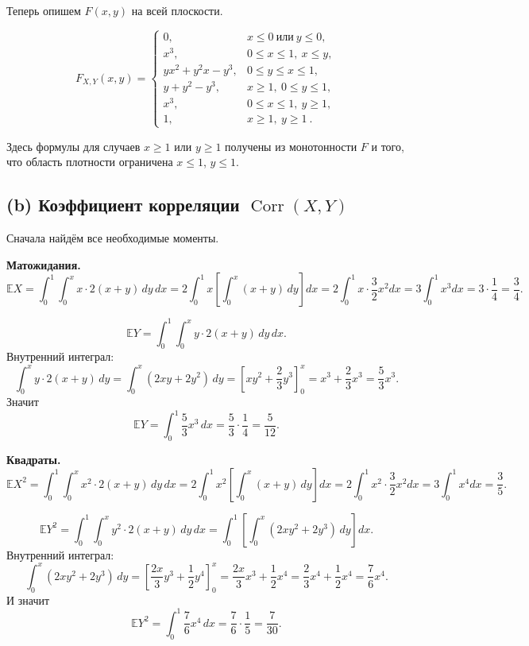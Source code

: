 \documentclass[12pt]{article}
\DeclareMathOperator{\Corr}{Corr}
\newcommand{\E}{\mathbb{E}}
\begin{document}
    Теперь опишем $F(x,y)$ на всей плоскости.

    \[
        F_{X,Y}(x,y)
        =
        \begin{cases}
            0, & x \le 0 \ \text{или}\ y \le 0,\\[6pt]
            x^3, & 0 \le x \le 1,\ x \le y,\\[6pt]
            yx^2 + y^2 x - y^3,
            & 0 \le y \le x \le 1,\\[6pt]
            y + y^2 - y^3, & x \ge 1,\ 0 \le y \le 1,\\[6pt]
            x^3, & 0 \le x \le 1,\ y \ge 1,\\[6pt]
            1, & x \ge 1,\ y \ge 1~.
        \end{cases}
    \]

    Здесь формулы для случаев $x \ge 1$ или $y \ge 1$
    получены из монотонности $F$ и того, что область плотности ограничена $x \le 1$, $y \le 1$.

    \subsection*{(b) Коэффициент корреляции $\Corr(X,Y)$}

    Сначала найдём все необходимые моменты.

    \textbf{Матожидания.}
    \[
        \E X
        = \int_0^1 \int_0^x x \cdot 2(x+y)\,dy\,dx
        = 2 \int_0^1 x \left[\int_0^x (x+y)\,dy\right] dx
        = 2 \int_0^1 x \cdot \frac{3}{2}x^2 dx
        = 3 \int_0^1 x^3 dx
        = 3 \cdot \frac{1}{4}
        = \frac{3}{4}.
    \]

    \[
        \E Y
        = \int_0^1 \int_0^x y \cdot 2(x+y)\,dy\,dx.
    \]
    Внутренний интеграл:
    \[
        \int_0^x y \cdot 2(x+y)\,dy
        = \int_0^x (2xy + 2y^2)\,dy
        = \left[x y^2 + \frac{2}{3}y^3\right]_0^x
        = x^3 + \frac{2}{3}x^3
        = \frac{5}{3}x^3.
    \]
    Значит
    \[
        \E Y
        = \int_0^1 \frac{5}{3}x^3\,dx
        = \frac{5}{3} \cdot \frac{1}{4}
        = \frac{5}{12}.
    \]

    \textbf{Квадраты.}
    \[
        \E X^2
        = \int_0^1 \int_0^x x^2 \cdot 2(x+y)\,dy\,dx
        = 2 \int_0^1 x^2 \left[\int_0^x (x+y)\,dy\right] dx
        = 2 \int_0^1 x^2 \cdot \frac{3}{2}x^2 dx
        = 3 \int_0^1 x^4 dx
        = \frac{3}{5}.
    \]

    \[
        \E Y^2
        = \int_0^1 \int_0^x y^2 \cdot 2(x+y)\,dy\,dx
        = \int_0^1 \left[ \int_0^x (2x y^2 + 2y^3)\,dy \right] dx.
    \]
    Внутренний интеграл:
    \[
        \int_0^x (2x y^2 + 2y^3)\,dy
        = \left[ \frac{2x}{3}y^3 + \frac{1}{2}y^4 \right]_0^x
        = \frac{2x}{3}x^3 + \frac{1}{2}x^4
        = \frac{2}{3}x^4 + \frac{1}{2}x^4
        = \frac{7}{6}x^4.
    \]
    И значит
    \[
        \E Y^2
        = \int_0^1 \frac{7}{6}x^4\,dx
        = \frac{7}{6}\cdot \frac{1}{5}
        = \frac{7}{30}.
    \]
\end{document}
